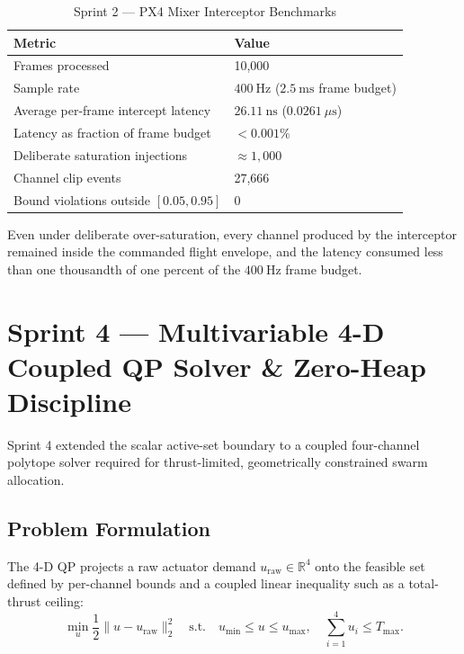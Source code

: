 \documentclass[11pt]{article}
\begin{document}
\begin{table}[htbp]
\centering
\caption{Sprint 2 --- PX4 Mixer Interceptor Benchmarks}
\label{tab:sprint2}
\begin{tabularx}{\textwidth}{@{}lX@{}}
\toprule
\textbf{Metric} & \textbf{Value} \\
\midrule
Frames processed & 10,000 \\
Sample rate & $400\ \text{Hz}$ ($2.5\ \text{ms}$ frame budget) \\
Average per-frame intercept latency & $26.11\ \text{ns}$ ($0.0261\ \mu\text{s}$) \\
Latency as fraction of frame budget & $<0.001\%$ \\
Deliberate saturation injections & $\approx 1{,}000$ \\
Channel clip events & 27,666 \\
Bound violations outside $[0.05, 0.95]$ & 0 \\
\bottomrule
\end{tabularx}
\end{table}

Even under deliberate over-saturation, every channel produced by the interceptor remained inside the commanded flight envelope, and the latency consumed less than one thousandth of one percent of the $400\ \text{Hz}$ frame budget.

\section[Sprint 4 --- Multivariable 4-D QP Solver]{Sprint 4 --- Multivariable 4-D Coupled QP Solver \& Zero-Heap Discipline}
\label{sec:sprint4}

Sprint 4 extended the scalar active-set boundary to a coupled four-channel polytope solver required for thrust-limited, geometrically constrained swarm allocation.

\subsection{Problem Formulation}

The 4-D QP projects a raw actuator demand $u_{\text{raw}} \in \mathbb{R}^4$ onto the feasible set defined by per-channel bounds and a coupled linear inequality such as a total-thrust ceiling:
\begin{equation*}
\min_u \frac{1}{2} \|u - u_{\text{raw}}\|_2^2
\quad \text{s.t.} \quad
u_{\min} \le u \le u_{\max},
\quad \sum_{i=1}^4 u_i \le T_{\max}.
\end{equation*}
\end{document}
